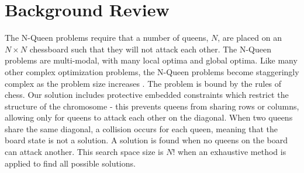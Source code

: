 \documentclass[conference]{IEEEtran}
\begin{document}
\section{Background Review}
The N-Queen problems require that a number of queens, $N$, are placed on an $N \times N$ chessboard such that they will not attack each other. The N-Queen problems are multi-modal, with many local optima and global optima. Like many other complex optimization problems, the N-Queen problems become staggeringly complex as the problem size increases \cite{cit:3}. The problem is bound by the rules of chess. Our solution includes protective embedded constraints which restrict the structure of the chromosome - this prevents queens from sharing rows or columns, allowing only for queens to attack each other on the diagonal. When two queens share the same diagonal, a collision occurs for each queen, meaning that the board state is not a solution. A solution is found when no queens on the board can attack another. This search space size is {$N!$} when an exhaustive method is applied to find all possible solutions. 
\end{document}

